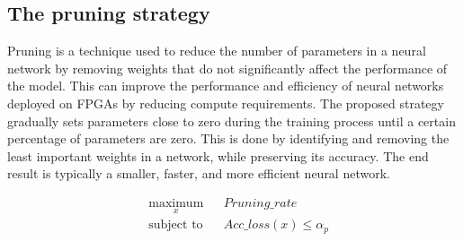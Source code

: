 
 



\subsection{The pruning strategy}\label{sec:pruning}

Pruning is a technique used to reduce the number of parameters in a neural network by removing weights that do not significantly affect the performance of the model. This can improve the performance and efficiency of neural networks deployed on FPGAs by reducing compute requirements. The proposed strategy gradually sets parameters close to zero during the training process until a certain percentage of parameters are zero. This is done by identifying and removing the least important weights in a network, while preserving its accuracy. The end result is typically a smaller, faster, and more efficient neural network.

	
\begin{equation}
\begin{aligned}
& \underset{x}{\text{maximum}}
& & Pruning\_rate \\
& \text{subject to}
& & Acc\_loss(x) \leq \alpha_p 
\end{aligned}
\end{equation}


